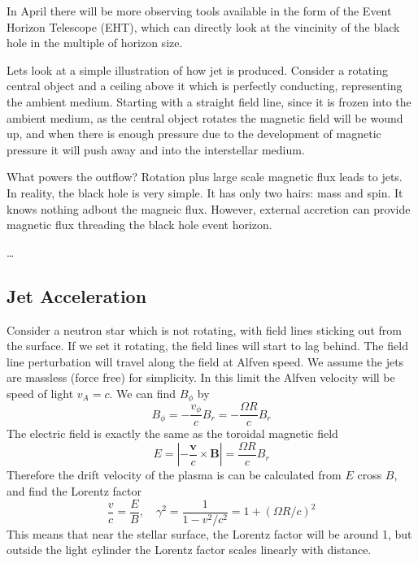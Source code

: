 \documentclass[letterpaper, 11pt]{article}
\numberwithin{equation}{section}
\numberwithin{figure}{section}
\begin{document}
In April there will be more observing tools available in the form of the Event
Horizon Telescope (EHT), which can directly look at the vincinity of the black
hole in the multiple of horizon size.

Lets look at a simple illustration of how jet is produced. Consider a rotating
central object and a ceiling above it which is perfectly conducting,
representing the ambient medium. Starting with a straight field line, since it
is frozen into the ambient medium, as the central object rotates the magnetic
field will be wound up, and when there is enough pressure due to the development of
magnetic pressure it will push away and into the interstellar medium.

What powers the outflow? Rotation plus large scale magnetic flux leads to jets.
In reality, the black hole is very simple. It has only two hairs: mass and spin.
It knows nothing adbout the magneic flux. However, external accretion can
provide magnetic flux threading the black hole event horizon.

\dots

\subsection{Jet Acceleration}

Consider a neutron star which is not rotating, with field lines sticking out
from the surface. If we set it rotating, the field lines will start to lag
behind. The field line perturbation will travel along the field at Alfven speed.
We assume the jets are massless (force free) for simplicity. In this limit the
Alfven velocity will be speed of light $v_{A} = c$. We can find $B_{\phi}$ by
\begin{equation}
  \label{eq:1}
  B_{\phi} = -\frac{v_{\phi}}{c}B_{r} = -\frac{\Omega R}{c}B_{r}
\end{equation}
The electric field is exactly the same as the toroidal magnetic field
\begin{equation}
  \label{eq:2}
  E = \left| -\frac{\mathbf{v}}{c}\times \mathbf{B} \right| = \frac{\Omega R}{c} B_r
\end{equation}
Therefore the drift velocity of the plasma is can be calculated from $E$ cross
$B$, and find the Lorentz factor
\begin{equation}
  \label{eq:3}
  \frac{v}{c} = \frac{E}{B}, \quad\gamma^2 = \frac{1}{1 - v^2/c^2} = 1 + (\Omega R/c)^2
\end{equation}
This means that near the stellar surface, the Lorentz factor will be around 1,
but outside the light cylinder the Lorentz factor scales linearly with distance.
\end{document}
